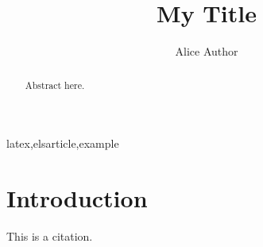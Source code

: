 \documentclass[3p,twocolumn]{elsarticle}
\begin{document}
\begin{frontmatter}
\title{My Title}
\author[inst1]{Alice Author}
\address[inst1]{University}
\begin{abstract}Abstract here.\end{abstract}
\begin{keyword}latex\sep elsarticle\sep example\end{keyword}
\end{frontmatter}

\section{Introduction}
This is a citation.\cite{JONES2020256HgHe} 


\end{document}
